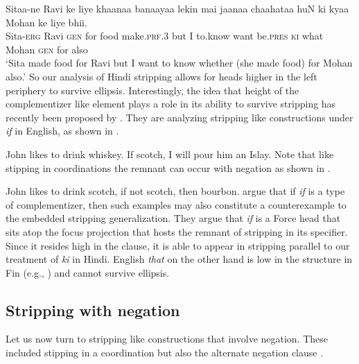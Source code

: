 \documentclass[output=paper]{langscibook}
\begin{document}
\ea \label{maex26}
    \gll Sitaa-ne Ravi ke liye khaanaa banaayaa lekin mai jaanaa chaahataa huN ki kyaa Mohan ke liye bhii.\\
    Sita-\textsc{erg} Ravi \textsc{gen} for food make.\textsc{prf.3} but I to.know want be.\textsc{pres} \textsc{ki} what Mohan \textsc{gen} for also\\
    \glt `Sita made food for Ravi but I want to know whether (she made food) for Mohan also.' 
\z 
So our analysis of Hindi stripping allows for heads higher in the left periphery to survive ellipsis. Interestingly, the idea that height of the complementizer like element plays a role in its ability to survive stripping has recently been proposed by \citet{yoshida18}. They are analyzing stripping like constructions under \emph{if} in English, as shown in .

\ea \label{maex27}
    John likes to drink whiskey. If scotch, I will pour him an Islay. \hfill \citep[1]{yoshida18}
\z 
Note that like stipping in coordinations the remnant can occur with negation as shown in .

\ea \label{maex28}
    John likes to drink scotch, if not scotch, then bourbon.
\z 
\citet{yoshida18} argue that if \emph{if} is a type of complementizer, then such examples may also constitute a counterexample to the embedded stripping generalization. They argue that \emph{if} is a Force head that sits atop the focus projection that hosts the remnant of stripping in its specifier. Since it resides high in the clause, it is able to appear in stripping parallel to our treatment of \emph{ki} in Hindi. English \emph{that} on the other hand is low in the structure in Fin (e.g., \citealt{baltin10}) and cannot survive ellipsis.



\subsection{Stripping with negation}
Let us now turn to stripping like constructions that involve negation. These included stipping in a coordination  but also the alternate negation clause .
\end{document}
